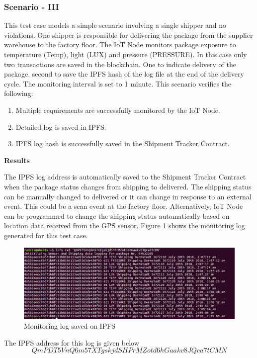 \subsubsection{Scenario - III}
This test case models a simple scenario involving a single shipper and no violations. One shipper is responsible for delivering the package from the  supplier warehouse to the factory floor. The IoT Node monitors package exposure to temperature (Temp), light (LUX) and pressure (PRESSURE). In this case only two transactions are saved in the blockchain. One to indicate delivery of the package, second to save the IPFS hash of the log file at the end of the delivery cycle. The monitoring interval is set to 1 minute. This scenario verifies the following:
 \begin{enumerate}
\item Multiple requirements are successfully monitored by the IoT Node.
\item Detailed log is saved in IPFS. 
\item IPFS log hash is successfully saved in the Shipment Tracker Contract.
\end{enumerate}

\textbf{Results}

The IPFS log address is automatically saved to the Shipment Tracker Contract when the package status changes from shipping to delivered. The shipping status can be manually changed to delivered or it can change in response to an external event. This could be a scan event at the factory floor. Alternatively, IoT Node can be programmed to change the shipping status automatically based on location data received from the GPS sensor. Figure \ref{fig:IPFSlog} shows the monitoring log generated for this test case.

\begin{figure}[h]
	\centering
    \includegraphics[width=170mm,scale=1]{figs/IPFSlog}
	\caption{Monitoring log saved on IPFS}
	\label{fig:IPFSlog} 
\end{figure}


The IPFS address for this log is given below
\[QmPDT5VnQ6m57XTgskjdSHPrMZotd6hGaakv8JQca7tCMN\]




